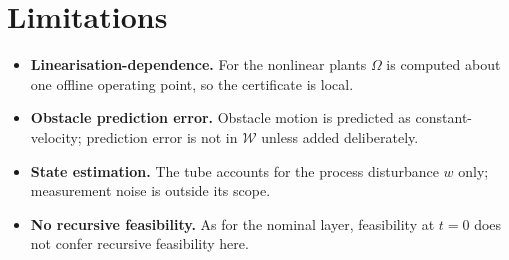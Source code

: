 \documentclass[11pt]{article}
\begin{document}
\section{Limitations}
\begin{itemize}
\item \textbf{Linearisation-dependence.} For the nonlinear plants $\Omega$ is computed about one
offline operating point, so the certificate is local.
\item \textbf{Obstacle prediction error.} Obstacle motion is predicted as constant-velocity;
prediction error is not in $\mathcal{W}$ unless added deliberately.
\item \textbf{State estimation.} The tube accounts for the process disturbance $w$ only;
measurement noise is outside its scope.
\item \textbf{No recursive feasibility.} As for the nominal layer, feasibility at $t=0$ does not
confer recursive feasibility here.
\end{itemize}
\end{document}
